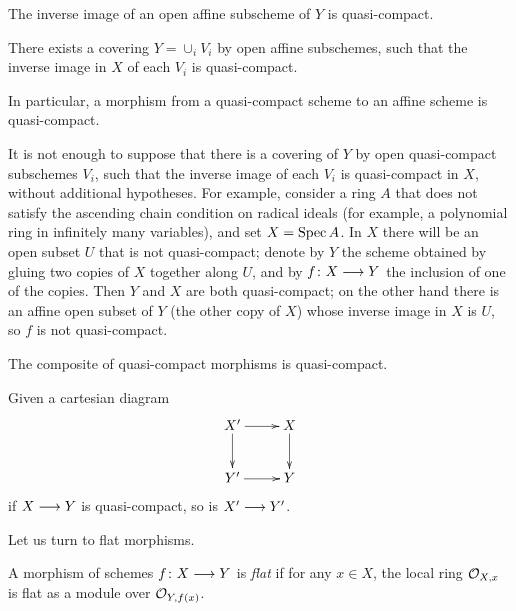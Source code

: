 \begin{1   PRELIMINARY NOTIONS}
\begin{1.1 Algebraic geometry}
\begin{proposition}
\begin{enumeratei}
\item The inverse image of an open affine subscheme of $Y$ is quasi-compact.

\item There exists a covering $Y = \cup_i V_i$ by open affine subschemes, such that the inverse image in $X$ of each $V_i$ is quasi-compact.
\end{enumeratei}

In particular, a morphism from a quasi-compact scheme to an affine scheme is quasi-compact.
\end{proposition}

\begin{remark}
It is not enough to suppose that there is a covering of $Y$ by open quasi-compact subschemes $V_i$, such that the inverse image of each $V_i$ is quasi-compact in $X$, without additional hypotheses. For example, consider a ring $A$ that does not satisfy the ascending chain condition on radical ideals (for example, a polynomial ring in infinitely many variables), and set $X = \operatorname{Spec} A$. In $X$ there will be an open subset $U$ that is not quasi-compact; denote by $Y$ the scheme obtained by gluing two copies of $X$ together along $U$, and by $f \colon X \arr Y$ the inclusion of one of the copies. Then $Y$ and $X$ are both quasi-compact; on the other hand there is an affine open subset of $Y$ (the other copy of $X$) whose inverse image in $X$ is $U$, so $f$ is not quasi-compact.
\end{remark}



\begin{proposition}\hfil

\begin{enumeratei}

\item The composite of quasi-compact morphisms is quasi-compact.

\item Given a cartesian diagram
   \[
   \xymatrix{
   X'\ar[r]\ar[d] & X\ar[d] \\
   Y' \ar[r] & Y
   }
   \]
if $X \arr Y$ is quasi-compact, so is $X' \arr Y'$.
\end{enumeratei}

\end{proposition}

Let us turn to flat morphisms. 

\begin{definition}
A morphism of schemes $f \colon X \arr Y$ is \emph{flat}%
%
 if for any $x \in X$, the local ring $\mathcal{O}_{X,x}$ is flat as a module over
$\mathcal{O}_{Y, f(x)}$.
\end{definition}


\end{1.1 Algebraic geometry}
\end{1   PRELIMINARY NOTIONS}
